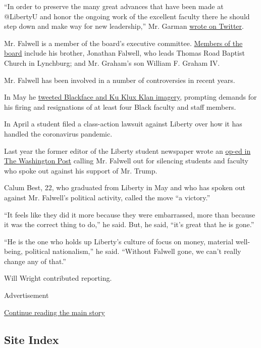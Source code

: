 ``In order to preserve the many great advances that have been made at
@LibertyU and honor the ongoing work of the excellent faculty there he
should step down and make way for new leadership,'' Mr. Garman
\href{https://twitter.com/ColbyGarman/status/1291849732759998466?s=20}{wrote
on Twitter}.

Mr. Falwell is a member of the board's executive committee.
\href{https://www.liberty.edu/trustees/}{Members of the board} include
his brother, Jonathan Falwell, who leads Thomas Road Baptist Church in
Lynchburg; and Mr. Graham's son William F. Graham IV.

Mr. Falwell has been involved in a number of controversies in recent
years.

In May he
\href{https://www.nytimes.com/2020/06/08/us/politics/jerry-falwell-blackface.html}{tweeted
Blackface and Ku Klux Klan imagery}, prompting demands for his firing
and resignations of at least four Black faculty and staff members.

In April a student filed a class-action lawsuit against Liberty over how
it has handled the coronavirus pandemic.

Last year the former editor of the Liberty student newspaper wrote an
\href{https://www.washingtonpost.com/outlook/2019/07/24/inside-liberty-universitys-culture-fear-how-jerry-falwell-jr-silences-students-professors-who-reject-his-pro-trump-politics/?arc404=true\&itid=lk_inline_manual_17}{op-ed
in The Washington Post} calling Mr. Falwell out for silencing students
and faculty who spoke out against his support of Mr. Trump.

Calum Best, 22, who graduated from Liberty in May and who has spoken out
against Mr. Falwell's political activity, called the move ``a victory.''

``It feels like they did it more because they were embarrassed, more
than because it was the correct thing to do,'' he said. But, he said,
``it's great that he is gone.''

``He is the one who holds up Liberty's culture of focus on money,
material well-being, political nationalism,'' he said. ``Without Falwell
gone, we can't really change any of that.''

Will Wright contributed reporting.

Advertisement

\protect\hyperlink{after-bottom}{Continue reading the main story}

\hypertarget{site-index}{%
\subsection{Site Index}\label{site-index}}

